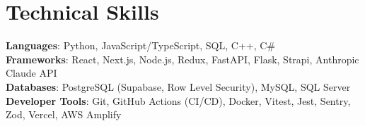 \documentclass[letterpaper,11pt]{article}
\begin{document}
\section{Technical Skills}
 \begin{itemize}[leftmargin=0.15in, label={}]
    \small{\item{
     \textbf{Languages}{: Python, JavaScript/TypeScript, SQL, C++, C\#} \\
     \textbf{Frameworks}{: React, Next.js, Node.js, Redux, FastAPI, Flask, Strapi, Anthropic Claude API} \\
     \textbf{Databases}{: PostgreSQL (Supabase, Row Level Security), MySQL, SQL Server} \\
     \textbf{Developer Tools}{: Git, GitHub Actions (CI/CD), Docker, Vitest, Jest, Sentry, Zod, Vercel, AWS Amplify}
    }}
 \end{itemize}


\end{document}
